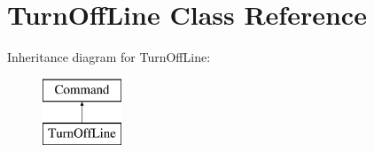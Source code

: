 \hypertarget{classTurnOffLine}{\section{Turn\-Off\-Line Class Reference}
\label{classTurnOffLine}
}
Inheritance diagram for Turn\-Off\-Line\-:\begin{figure}[H]
\begin{center}
\leavevmode
\includegraphics[height=2.000000cm]{classTurnOffLine}
\end{center}
\end{figure}
